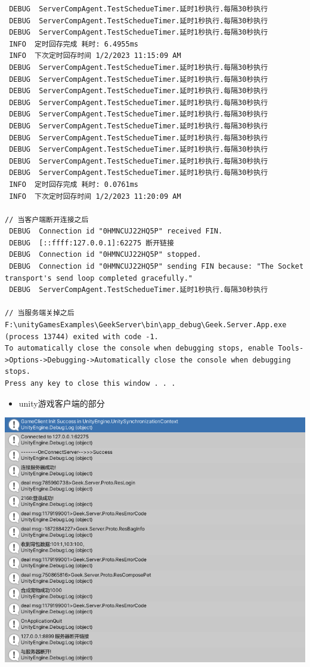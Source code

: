 \documentclass[9pt, b5paper]{article}
\begin{document}
\begin{verbatim}
 DEBUG  ServerCompAgent.TestSchedueTimer.延时1秒执行.每隔30秒执行
 DEBUG  ServerCompAgent.TestSchedueTimer.延时1秒执行.每隔30秒执行
 DEBUG  ServerCompAgent.TestSchedueTimer.延时1秒执行.每隔30秒执行
 INFO  定时回存完成 耗时: 6.4955ms
 INFO  下次定时回存时间 1/2/2023 11:15:09 AM
 DEBUG  ServerCompAgent.TestSchedueTimer.延时1秒执行.每隔30秒执行
 DEBUG  ServerCompAgent.TestSchedueTimer.延时1秒执行.每隔30秒执行
 DEBUG  ServerCompAgent.TestSchedueTimer.延时1秒执行.每隔30秒执行
 DEBUG  ServerCompAgent.TestSchedueTimer.延时1秒执行.每隔30秒执行
 DEBUG  ServerCompAgent.TestSchedueTimer.延时1秒执行.每隔30秒执行
 DEBUG  ServerCompAgent.TestSchedueTimer.延时1秒执行.每隔30秒执行
 DEBUG  ServerCompAgent.TestSchedueTimer.延时1秒执行.每隔30秒执行
 DEBUG  ServerCompAgent.TestSchedueTimer.延时1秒执行.每隔30秒执行
 DEBUG  ServerCompAgent.TestSchedueTimer.延时1秒执行.每隔30秒执行
 DEBUG  ServerCompAgent.TestSchedueTimer.延时1秒执行.每隔30秒执行
 INFO  定时回存完成 耗时: 0.0761ms
 INFO  下次定时回存时间 1/2/2023 11:20:09 AM

// 当客户端断开连接之后
 DEBUG  Connection id "0HMNCUJ22HQ5P" received FIN.
 DEBUG  [::ffff:127.0.0.1]:62275 断开链接
 DEBUG  Connection id "0HMNCUJ22HQ5P" stopped.
 DEBUG  Connection id "0HMNCUJ22HQ5P" sending FIN because: "The Socket transport's send loop completed gracefully."
 DEBUG  ServerCompAgent.TestSchedueTimer.延时1秒执行.每隔30秒执行

// 当服务端关掉之后
F:\unityGamesExamples\GeekServer\bin\app_debug\Geek.Server.App.exe (process 13744) exited with code -1.
To automatically close the console when debugging stops, enable Tools->Options->Debugging->Automatically close the console when debugging stops.
Press any key to close this window . . .
\end{verbatim}
\begin{itemize}
\item unity游戏客户端的部分
\end{itemize}

\begin{center}
\includegraphics[width=.9\linewidth]{./pic/readme_20230102_111227.png}
\end{center}
\end{document}
